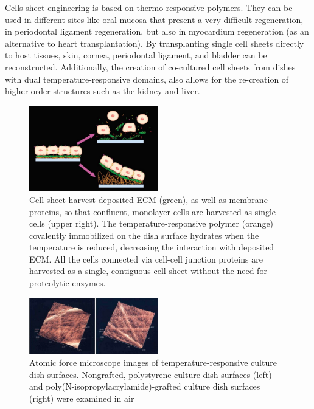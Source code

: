 Cells sheet engineering is based on thermo-responsive polymers. They can be used in different sites like oral mucosa that present a very difficult regeneration, in periodontal ligament regeneration, but also in myocardium regeneration (as an alternative to heart transplantation).
By transplanting single cell sheets directly to host tissues, skin, cornea, periodontal ligament, and bladder can be reconstructed. Additionally, the creation of co-cultured cell sheets from dishes with dual temperature-responsive domains, also allows for the re-creation of higher-order structures such as the kidney and liver.

\begin{figure}[H]
        \centering
        \includegraphics[width=0.5\textwidth]{cells_sheet1.png}
    \caption{\label{fig:cells_sheet1} Cell sheet harvest deposited ECM (green), as well as membrane proteins, so that confluent, monolayer cells are harvested as single cells (upper right). The temperature-responsive polymer (orange) covalently immobilized on the dish surface hydrates when the temperature is reduced, decreasing the interaction with deposited ECM. All the cells connected via cell-cell junction proteins are harvested as a single, contiguous cell sheet without the need for proteolytic enzymes.}
\end{figure}

\begin{figure}[H]
        \centering
        \includegraphics[width=0.5\textwidth]{cells_sheet2.png}
        \caption{\label{fig:cells_sheet2} Atomic force microscope images of temperature-responsive culture dish surfaces. Nongrafted, polystyrene culture dish surfaces (left) and poly(N-isopropylacrylamide)-grafted culture dish surfaces (right) were examined in air}
\end{figure}

